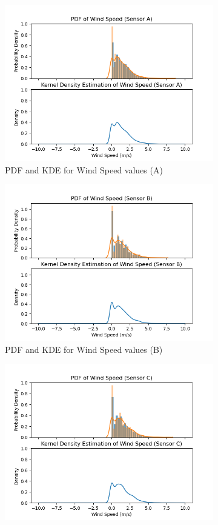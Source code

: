 \documentclass[a4paper,12pt]{article} %
\begin{document}
\begin{figure}[H] %
	\centering %
	\begin{subfigure}[b]{0.4\linewidth}
		\includegraphics[width=0.9\linewidth]{Figure_10.png} 
		\caption{PDF and KDE for Wind Speed values (A)}
	\end{subfigure}
	\begin{subfigure}[b]{0.4\linewidth}
		\includegraphics[width=0.9\linewidth]{Figure_11.png} 
		\caption{PDF and KDE for Wind Speed values (B)}
	\end{subfigure}
	\begin{subfigure}[b]{0.4\linewidth}
		\includegraphics[width=0.9\linewidth]{Figure_12.png} 

\end{subfigure}
\end{figure}
\end{document}
